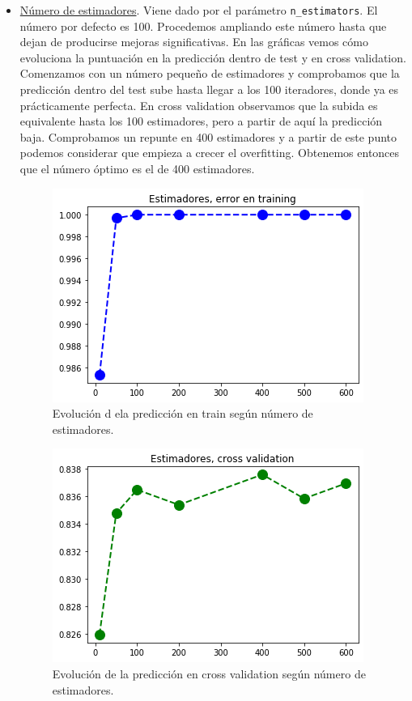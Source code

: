 \documentclass[11pt,a4paper]{article}
\begin{document}
\begin{itemize}
\item \underline{Número de estimadores}. Viene dado por el parámetro \texttt{n\_estimators}. El número por defecto es 100. Procedemos ampliando este número hasta que dejan de producirse mejoras significativas. En las gráficas vemos cómo evoluciona la puntuación en la predicción dentro de test y en cross validation. Comenzamos con un número pequeño de estimadores y comprobamos que la predicción dentro del test sube hasta llegar a los 100 iteradores, donde ya es prácticamente perfecta. En cross validation observamos que la subida es equivalente hasta los 100 estimadores, pero a partir de aquí la predicción baja. Comprobamos un repunte en 400 estimadores y a partir de este punto podemos considerar que empieza a crecer el overfitting. Obtenemos entonces que el número óptimo es el de 400 estimadores.

    \begin{figure}[h!]
      \label{figure:rf_estimadores_ein}
      \centering
      \includegraphics[scale = 0.6]{./figures/rf_estimadores_ein.png}
      \caption{Evolución d ela predicción en train según número de estimadores.}
    \end{figure}


    \begin{figure}[h!]
      \label{figure:rf_estimadores_cv}
      \centering
      \includegraphics[scale=0.6]{./figures/rf_estimadores_cv.png}
      \caption{Evolución de la predicción en cross validation según número de estimadores.}
    \end{figure}



\end{itemize}
\end{document}
